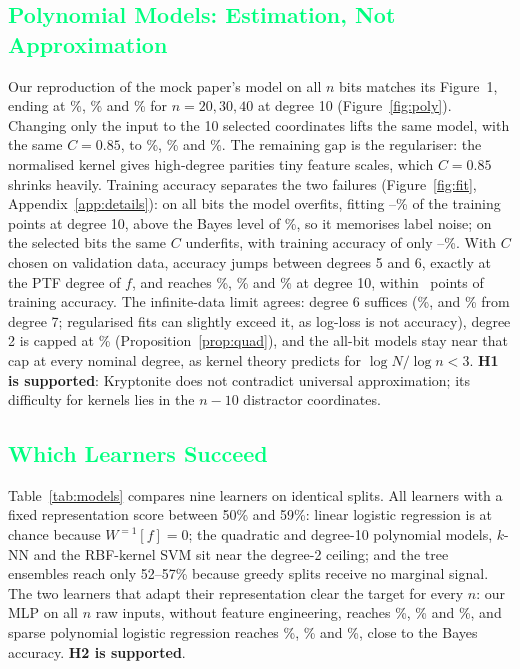 \documentclass{article}
\newcommand{\csubsection}[1]{\subsection{\textcolor{springgreen}{#1}}}
\theoremstyle{plain}
\begin{document}
\csubsection{Polynomial Models: Estimation, Not Approximation}
\label{sec:poly}
Our reproduction of the mock paper's model on all $n$ bits matches its Figure~1, ending at \MockTwentyTen\%, \MockThirtyTen\% and \MockFortyTen\% for $n=20,30,40$ at degree 10 (Figure~\ref{fig:poly}). Changing only the input to the 10 selected coordinates lifts the same model, with the same $C=0.85$, to \SelFixedTwenty\%, \SelFixedThirty\% and \SelFixedForty\%. The remaining gap is the regulariser: the normalised kernel gives high-degree parities tiny feature scales, which $C=0.85$ shrinks heavily. Training accuracy separates the two failures (Figure~\ref{fig:fit}, Appendix~\ref{app:details}): on all bits the model overfits, fitting \MockTrainTenTwenty--\MockTrainTenForty\% of the training points at degree 10, above the Bayes level of \BayesPct\%, so it memorises label noise; on the selected bits the same $C$ underfits, with training accuracy of only \SelFixedTrainTenTwenty--\SelFixedTrainTenForty\%. With $C$ chosen on validation data, accuracy jumps between degrees 5 and 6, exactly at the PTF degree of $f$, and reaches \SelTunedTwenty\%, \SelTunedThirty\% and \SelTunedForty\% at degree 10, within \TunedGapMax\ points of training accuracy. The infinite-data limit agrees: degree 6 suffices (\LimitSix\%, and \LimitSeven\% from degree 7; regularised fits can slightly exceed it, as log-loss is not accuracy), degree 2 is capped at \LimitTwo\% (Proposition~\ref{prop:quad}), and the all-bit models stay near that cap at every nominal degree, as kernel theory predicts for $\log N/\log n<3$. \textbf{H1 is supported}: Kryptonite does not contradict universal approximation; its difficulty for kernels lies in the $n-10$ distractor coordinates.


\csubsection{Which Learners Succeed}
\label{sec:compare}
Table~\ref{tab:models} compares nine learners on identical splits. All learners with a fixed representation score between 50\% and 59\%: linear logistic regression is at chance because $W^{=1}[f]=0$; the quadratic and degree-10 polynomial models, $k$-NN and the RBF-kernel SVM sit near the degree-2 ceiling; and the tree ensembles reach only 52--57\% because greedy splits receive no marginal signal. The two learners that adapt their representation clear the target for every $n$: our MLP on all $n$ raw inputs, without feature engineering, reaches \MLPTwentyMean\%, \MLPThirtyMean\% and \MLPFortyMean\%, and sparse polynomial logistic regression reaches \SparseTwentyMean\%, \SparseThirtyMean\% and \SparseFortyMean\%, close to the Bayes accuracy. \textbf{H2 is supported}.
\end{document}
